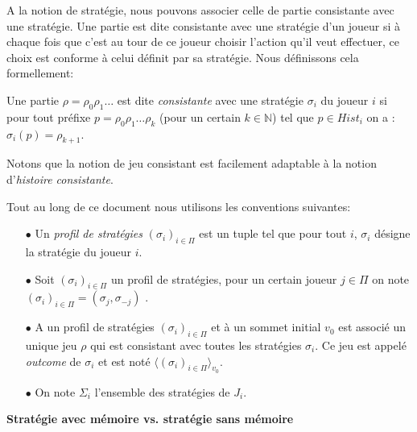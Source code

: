 A la notion de stratégie, nous pouvons associer celle de partie consistante avec une stratégie. Une partie est dite consistante avec une stratégie d'un joueur  si à chaque fois que c'est au tour de ce joueur choisir l'action qu'il veut effectuer, ce choix est conforme à celui définit par sa stratégie. Nous définissons cela formellement:

\begin{defi}	
	Une partie $\rho = \rho _{0}  \rho _{1} \ldots$ est dite \textit{consistante} avec une stratégie $\sigma _{i}$ du joueur $i$ si pour tout préfixe $p = \rho _{0}\rho _{1}\ldots \rho _{k}$ (pour un certain $k \in \mathbb{N}$) tel que $p \in Hist_{i}$ on a : $\sigma _{i}(p) = \rho_{k+1}$.	
\end{defi}

	Notons que la notion de jeu consistant est facilement adaptable à la notion d'\textit{histoire consistante}.

\begin{notations}
	Tout au long de ce document nous utilisons les conventions suivantes:
	\begin{enumerate}
		\item[$\bullet$] Un \textit{profil de stratégies} $(\sigma _{i})_{i \in \Pi}$ est un tuple tel que pour tout $i$, $\sigma _{i}$ désigne la stratégie du 	joueur $i$. 
				
		\item[$\bullet$] Soit  $(\sigma _{i})_{i \in \Pi}$ un profil de stratégies, pour un certain joueur $j\in \Pi $ on note $(\sigma _{i})_{i \in \Pi} = ( \sigma _{j},\sigma _{-j})$ .
		
		\item[$\bullet$] A un profil de stratégies $(\sigma _{i})_{i \in \Pi}$ et à un sommet initial $v_{0}$ est associé un unique jeu $\rho$ qui est consistant avec toutes les stratégies $\sigma _{i}$. Ce jeu est appelé \textit{outcome} de $\sigma _{i}$ et est noté $\langle (\sigma _{i})_{i\in \Pi} \rangle_{v_0}$.
		
		\item[$\bullet$] On note $\Sigma _{i}$ l'ensemble des stratégies de $J_{i}$.
		
	\end{enumerate}
\end{notations}
		



\noindent\textbf{Stratégie avec mémoire vs. stratégie sans mémoire}\\



